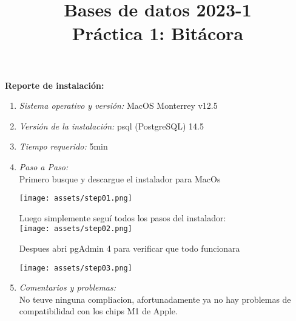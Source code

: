 \documentclass[12pt,a4paper]{article}
\title{Bases de datos 2023-1\\
Práctica 1: Bitácora}
\begin{document}
\maketitle

\textbf{Reporte de instalación:}\\
\begin{enumerate}
	\item \textit{Sistema operativo y versión:} MacOS Monterrey v12.5\\


	\item \textit{Versión de la instalación:} psql (PostgreSQL) 14.5\\

	\item \textit{Tiempo requerido:} 5min\\

	\item \textit{Paso a Paso:}\\
		Primero busque y descargue el instalador para MacOs 
		
		\texttt{[image: assets/step01.png]}

		Luego simplemente seguí todos los pasos del instalador:\\
		
		\texttt{[image: assets/step02.png]}

	    Despues abri pgAdmin 4 para verificar que todo funcionara
	
		\texttt{[image: assets/step03.png]}

	

	\item \textit{Comentarios y problemas:}\\
		No teuve ninguna compliacion, afortunadamente ya no hay problemas de compatibilidad con los chips M1 de Apple.
\end{enumerate}
\end{document}
